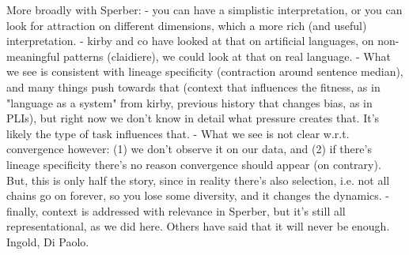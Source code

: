 More broadly with Sperber:
  - you can have a simplistic interpretation, or you can look for attraction on different dimensions, which a more rich (and useful) interpretation.
  - kirby and co have looked at that on artificial languages, on non-meaningful patterns (claidiere), we could look at that on real language.
  - What we see is consistent with lineage specificity (contraction around sentence median), and many things push towards that (context that influences the fitness, as in "language as a system" from kirby, previous history that changes bias, as in PLIs), but right now we don't know in detail what pressure creates that. It's likely the type of task influences that.
  - What we see is not clear w.r.t. convergence however: (1) we don't observe it on our data, and (2) if there's lineage specificity there's no reason convergence should appear (on contrary). But, this is only half the story, since in reality there's also selection, i.e. not all chains go on forever, so you lose some diversity, and it changes the dynamics.
  - finally, context is addressed with relevance in Sperber, but it's still all representational, as we did here. Others have said that it will never be enough. Ingold, Di Paolo.

























